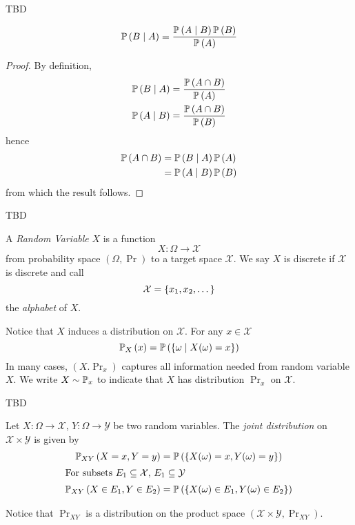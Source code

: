 \begin{example}
    TBD
\end{example}

\begin{theorem}
    \[\prob{B \given A} = \frac{\prob{A \given B}\prob{B}}{\prob{A}}\]
\end{theorem}

\begin{proof}
    By definition,
    \begin{align*}
        \prob{B \given A} & = \frac{\prob{A \cap B}}{\prob{A}} \\
        \prob{A \given B} & = \frac{\prob{A \cap B}}{\prob{B}}
    \end{align*}
    hence
    \begin{align*}\prob{A \cap B}
         & = \prob{B \given A}\prob{A} \\
         & = \prob{A \given B}\prob{B}
    \end{align*}
    from which the result follows.
\end{proof}

\begin{example}
    TBD
\end{example}

\begin{definition}
    A \emph{Random Variable} $X$ is a function
    \[X: \Omega \to \mathcal{X}\]
    from probability space $(\Omega, \Pr)$ to a target space $\mathcal{X}$. We
    say $X$ is discrete if $\mathcal{X}$ is discrete and call
    \[\mathcal{X} = \left\lbrace x_1, x_2, \dots\right\rbrace\]
    the \emph{alphabet} of $X$.
\end{definition}

Notice that $X$ induces a distribution on $\mathcal{X}$. For any $x \in \mathcal{X}$
\[\prob[X]{x} = \prob{\set{\omega \suchthat X(\omega) = x}}\]
In many cases, $(X. \Pr_x)$ captures all information needed from random variable $X$.
We write $X \sim \mathbb{P}_x$ to indicate that $X$ has distribution $\Pr_x$ on $\mathcal{X}$.

\begin{example}
    TBD
\end{example}

\begin{definition}
    Let $X: \Omega \to \mathcal{X}$, $Y: \Omega \to \mathcal{Y}$ be two random variables.
    The \emph{joint distribution} on $\mathcal{X} \times \mathcal{Y}$ is given by
    \begin{align*}
        \prob[XY]{X = x, Y = y}         & = \prob{\set{X(\omega) = x, Y(\omega) = y}}         \\
        \shortintertext{For subsets $E_1\subseteq \mathcal{X}$, $E_1 \subseteq \mathcal{Y}$}
        \prob[XY]{X \in E_1, Y \in E_2} & = \prob{\set{X(\omega) \in E_1, Y(\omega) \in E_2}}
    \end{align*}
\end{definition}
Notice that $\Pr_{XY}$ is a distribution on the product space
$(\mathcal{X} \times \mathcal{Y}, \Pr_{XY})$.

